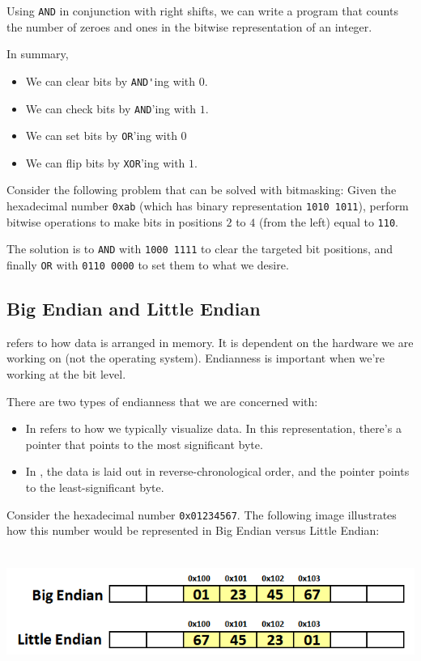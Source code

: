 Using \verb!AND! in conjunction with right shifts, we can write a program that counts the number of zeroes and ones in the bitwise representation of an integer.

In summary, \begin{itemize}
    \item We can clear bits by \verb!AND'!ing with $0$.
    \item We can check bits by \verb!AND!'ing with $1$.
    \item We can set bits by \verb!OR!'ing with $0$
    \item We can flip bits by \verb!XOR!'ing with $1$. 
\end{itemize}


Consider the following problem that can be solved with bitmasking: Given the hexadecimal number \verb!0xab! (which has binary representation \verb!1010 1011!), perform bitwise operations to make bits in positions $2$ to $4$ (from the left) equal to \verb!110!. 

The solution is to \verb!AND! with \verb!1000 1111! to clear the targeted bit positions, and finally \verb!OR! with \verb!0110 0000! to set them to what we desire. 


\subsection{Big Endian and Little Endian}

 refers to how data is arranged in memory. It is dependent on the hardware we are working on (not the operating system). Endianness is important when we're working at the bit level. 

There are two types of endianness that we are concerned with: \begin{itemize}
    \item In  refers to how we typically visualize data. In this representation, there's a pointer that points to the most significant byte. 
    \item In , the data is laid out in reverse-chronological order, and the pointer points to the least-significant byte.
\end{itemize}


Consider the hexadecimal number \verb!0x01234567!. The following image illustrates how this number would be represented in Big Endian versus Little Endian:

\begin{center}
\includegraphics[width=\textwidth, height=4cm]{june28/endianness}
\label{conversiontable:1}
\end{center}

